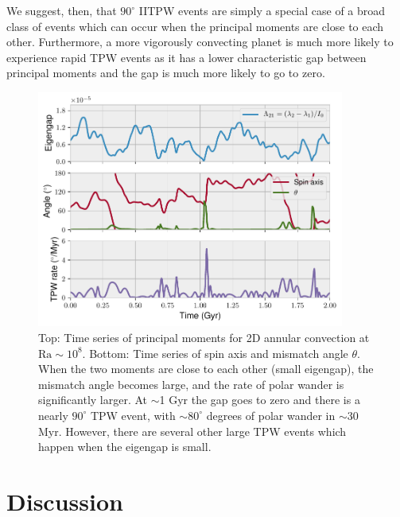 \documentclass[extra,mreferee]{gji}
\begin{document}
We suggest, then, that $90^\circ$ IITPW events are simply a special case of a broad class of events which can occur
when the principal moments are close to each other.  Furthermore, a more vigorously convecting planet is much more likely to experience rapid TPW events
as it has a lower characteristic gap between principal moments and the gap is much more likely to go to zero.

\begin{figure}
\centering
\includegraphics[width=0.9\textwidth]{figures/misfit.pdf}
\caption{Top: Time series of principal moments for 2D annular convection at $\mathrm{Ra}\sim10^8$.  Bottom: Time series of spin axis and mismatch angle $\theta$.  When the two moments are close to each other (small eigengap), the mismatch angle becomes large, and the rate of polar wander is significantly larger. At $\sim$1 Gyr the gap goes to zero and there is a nearly $90^\circ$ TPW event, with $\sim80^\circ$ degrees of polar wander in $\sim$30 Myr. However, there are several other large TPW events which happen when the eigengap is small.}
\label{fig:misfit}
\end{figure}


\section{Discussion}
\label{sec:discussion}
\end{document}
